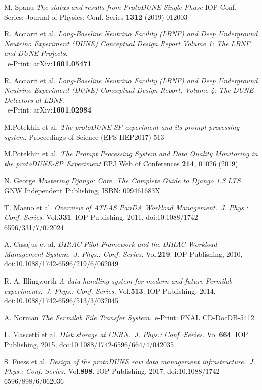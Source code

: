 \documentclass{webofc}
\begin{document}
\begin{thebibliography}{99}

M. Spanu
\emph{The status and results from ProtoDUNE Single Phase}
IOP Conf. Series: Journal of Physics: Conf. Series \textbf{1312} (2019) 012003

R. Acciarri et al.
\emph{Long-Baseline Neutrino Facility (LBNF) and Deep Underground Neutrino Experiment (DUNE) Conceptual Design Report Volume 1: The LBNF and DUNE Projects}.\\ ~e-Print: arXiv:\textbf{1601.05471}


R. Acciarri et al.
\emph{Long-Baseline Neutrino Facility (LBNF) and Deep Underground Neutrino Experiment (DUNE) Conceptual Design Report, Volume 4: The DUNE Detectors at LBNF}.\\~e-Print: arXiv:\textbf{1601.02984}

 M.Potekhin et al. \emph{The protoDUNE-SP experiment and its prompt
processing system}. Proceedings of Science (EPS-HEP2017) 513

 M.Potekhin et al. \emph{The Prompt Processing System
and Data Quality Monitoring in the protoDUNE-SP Experiment}
EPJ Web of Conferences \textbf{214}, 01026 (2019)

N. George \emph{Mastering Django: Core. The Complete Guide to Django 1.8 LTS}~ GNW Independent Publishing, ISBN: 099461683X

T. Maeno et al. \emph{Overview of ATLAS PanDA Workload Management.~J. Phys.: Conf. Series.} Vol.\textbf{331}. IOP Publishing, 2011,
doi:10.1088/1742-6596/331/7/072024


A. Casajus et al.  \emph{DIRAC Pilot Framework and the DIRAC
Workload Management System.~J. Phys.: Conf. Series.} Vol.\textbf{219}. IOP Publishing, 2010,
doi:10.1088/1742-6596/219/6/062049

R. A. Illingworth \emph{A data handling system for modern and future Fermilab experiments.~J. Phys.: Conf. Series.} Vol.\textbf{513}. IOP Publishing, 2014,
doi:10.1088/1742-6596/513/3/032045

A. Norman \emph{The Fermilab File Transfer System}.~e-Print: FNAL CD-DocDB-5412

 L. Mascetti et al. \emph{Disk storage at CERN.~J. Phys.: Conf. Series.} Vol.\textbf{664}. IOP Publishing, 2015,
doi:10.1088/1742-6596/664/4/042035

S. Fuess et al. \emph{Design of the protoDUNE raw data management
infrastructure.~J. Phys.: Conf. Series.} Vol.\textbf{898}. IOP Publishing, 2017,
doi:10.1088/1742-6596/898/6/062036



\end{thebibliography}
\end{document}
